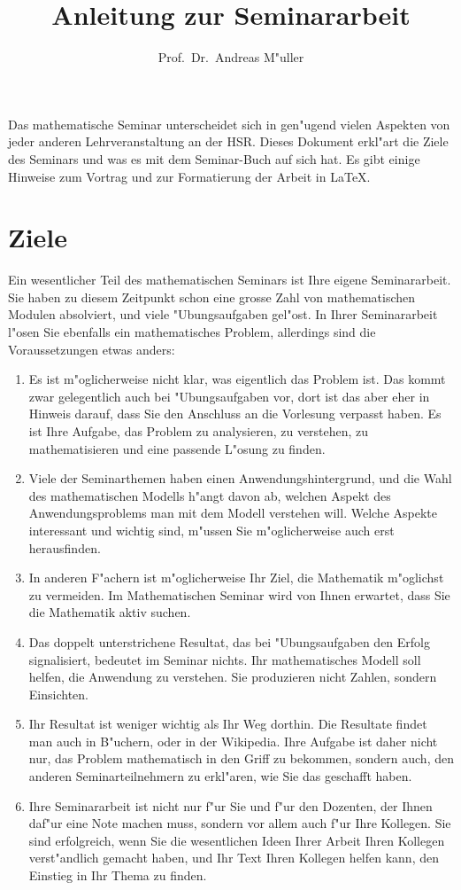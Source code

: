 \documentclass[a4paper]{article}
\begin{document}
\title{Anleitung zur Seminararbeit}
\author{Prof.~Dr.~Andreas M"uller}
\date{}
\maketitle
Das mathematische Seminar unterscheidet sich in gen"ugend vielen Aspekten
von jeder anderen Lehrveranstaltung an der HSR.
Dieses Dokument erkl"art die Ziele des Seminars und was es mit dem
Seminar-Buch auf sich hat.
Es gibt einige Hinweise zum Vortrag und zur Formatierung der
Arbeit in \LaTeX.
\section{Ziele}
Ein wesentlicher Teil des mathematischen Seminars ist Ihre eigene 
Seminararbeit.
Sie haben zu diesem Zeitpunkt schon eine grosse Zahl von mathematischen
Modulen absolviert, und viele "Ubungsaufgaben gel"ost.
In Ihrer Seminararbeit l"osen Sie ebenfalls ein mathematisches
Problem, allerdings sind die Voraussetzungen etwas anders:
\begin{enumerate}
\item
Es ist m"oglicherweise nicht klar, was eigentlich das Problem ist. 
Das kommt zwar gelegentlich auch bei "Ubungsaufgaben vor, dort ist
das aber eher in Hinweis darauf, dass Sie den Anschluss an die Vorlesung
verpasst haben.
Es ist Ihre Aufgabe, das Problem zu analysieren, zu verstehen, zu
mathematisieren und eine passende L"osung zu finden.
\item
Viele der Seminarthemen haben einen Anwendungshintergrund, und die
Wahl des mathematischen Modells h"angt davon ab, welchen Aspekt des
Anwendungsproblems man mit dem Modell verstehen will.
Welche Aspekte interessant und wichtig sind, m"ussen Sie m"oglicherweise
auch erst herausfinden.
\item
In anderen F"achern ist m"oglicherweise Ihr Ziel, die Mathematik
m"oglichst zu vermeiden.
Im Mathematischen Seminar wird von Ihnen erwartet, dass Sie die Mathematik
aktiv suchen.
\item
Das doppelt unterstrichene Resultat, das bei "Ubungsaufgaben 
den Erfolg signalisiert, bedeutet im Seminar nichts. 
Ihr mathematisches Modell soll helfen, die Anwendung zu verstehen.
Sie produzieren nicht Zahlen, sondern Einsichten.
\item
Ihr Resultat ist weniger wichtig als Ihr Weg dorthin. 
Die Resultate findet man auch in B"uchern, oder in der Wikipedia.
Ihre Aufgabe ist daher nicht nur, das Problem mathematisch in den
Griff zu bekommen, sondern auch, den anderen Seminarteilnehmern zu
erkl"aren, wie Sie das geschafft haben.
\item
Ihre Seminararbeit ist nicht nur f"ur Sie und f"ur den Dozenten,
der Ihnen daf"ur eine Note machen muss, sondern vor allem auch f"ur
Ihre Kollegen. 
Sie sind erfolgreich, wenn Sie die wesentlichen Ideen Ihrer Arbeit
Ihren Kollegen verst"andlich gemacht haben, und Ihr Text Ihren
Kollegen helfen kann, den Einstieg in Ihr Thema zu finden.
\end{enumerate}
\end{document}
